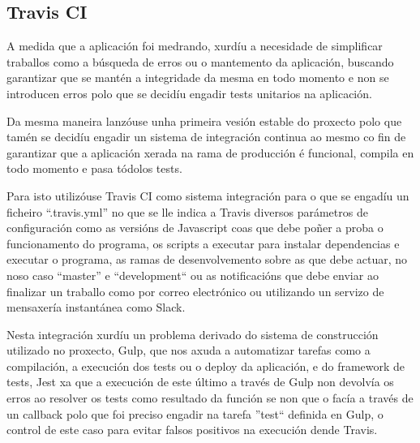     \subsection{Travis CI}
    A medida que a aplicación foi medrando, xurdíu a necesidade de simplificar 
traballos como a búsqueda de erros ou o mantemento da aplicación, buscando 
garantizar que se mantén a integridade da mesma en todo momento e non se 
introducen erros polo que se decidíu engadir tests unitarios na aplicación.

    Da mesma maneira lanzóuse unha primeira vesión estable do proxecto polo 
que tamén se decidíu engadir un sistema de integración continua ao mesmo co 
fin de garantizar que a aplicación xerada na rama de producción é funcional, 
compila en todo momento e pasa tódolos tests.

    Para isto utilizóuse Travis CI como sistema integración para o que se 
engadíu un ficheiro ``.travis.yml'' no que se lle indica a Travis diversos 
parámetros de configuración como as versións de Javascript coas que debe poñer 
a proba o funcionamento do programa, os scripts a executar para instalar 
dependencias e executar o programa, as ramas de desenvolvemento sobre as que 
debe actuar, no noso caso ``master'' e ``development`` ou as notificacións que 
debe enviar ao finalizar un traballo como por correo electrónico ou utilizando 
un servizo de mensaxería instantánea como Slack.

    Nesta integración xurdíu un problema derivado do sistema de construcción 
utilizado no proxecto, Gulp, que nos axuda a automatizar tarefas como a 
compilación, a execución dos tests ou o deploy da aplicación, e do framework de 
tests, Jest xa que a execución de este último a través de Gulp non devolvía os 
erros ao resolver os tests como resultado da función se non que o facía a 
través de un callback polo que foi preciso engadir na tarefa ''test`` definida 
en Gulp, o control de este caso para evitar falsos positivos na execución dende 
Travis.
